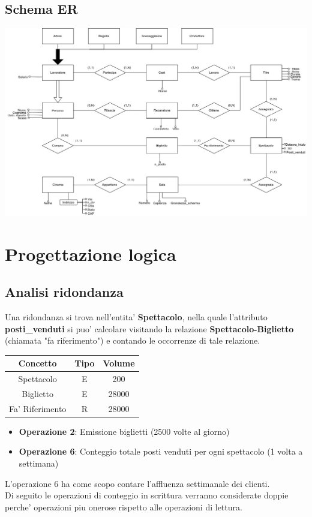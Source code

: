 \documentclass[10pt]{article}
\begin{document}
	\subsection{Schema ER}	
	\includegraphics[height=\textwidth, width=20cm, angle=90]{Schemas/SchemaER}
	\section{Progettazione logica}
	\subsection{Analisi ridondanza}	
	Una ridondanza si trova nell'entita' \textbf{Spettacolo}, nella quale l'attributo \textbf{posti\_venduti} si puo' calcolare visitando la relazione \textbf{Spettacolo-Biglietto} (chiamata "fa riferimento") e contando le occorrenze di tale relazione.
	\begin{table}[!h]
		\centering
		\begin{tabular}{|c|c|c|}
			\hline
			\textbf{Concetto} & \textbf{Tipo} & \textbf{Volume} \\
			\hline
			Spettacolo & E & 200 \\
			\hline
			Biglietto & E & 28000 \\
			\hline
			Fa' Riferimento & R & 28000 \\
			\hline
		\end{tabular}
	\end{table}
	\begin{itemize}
		\item \textbf{Operazione 2}: Emissione biglietti (2500 volte al giorno)
		\item \textbf{Operazione 6}: Conteggio totale posti venduti per ogni spettacolo (1 volta a settimana)		
	\end{itemize}
	L'operazione 6 ha come scopo contare l'affluenza settimanale dei clienti.\\
	Di seguito le operazioni di conteggio in scrittura verranno considerate doppie perche' operazioni piu onerose rispetto alle operazioni di lettura.
\end{document}

